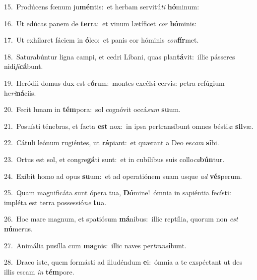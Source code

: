 {\numbfont\textcolor{\numbcolor}{15.}}~Prodúcens fœnum ju\-\textbf{mén}\-tis:~\star et herbam servitú\textit{ti} \textbf{hó}\-minum:\par
{\numbfont\textcolor{\numbcolor}{16.}}~Ut edúcas panem de \textbf{ter}\-ra:~\star et vinum lætíficet \textit{cor} \textbf{hó}\-minis:\par
{\numbfont\textcolor{\numbcolor}{17.}}~Ut exhílaret fáciem in \textbf{ó}\-leo:~\star et panis cor hóminis \textit{con}\-\textbf{fír}met.\par
{\numbfont\textcolor{\numbcolor}{18.}}~Saturabúntur ligna campi, et cedri Líbani, quas plan\-\textbf{tá}\-vit:~\star illic pásseres nidi\-\textit{fi}\-\textbf{cá}bunt.\par
{\numbfont\textcolor{\numbcolor}{19.}}~Heródii domus dux est e\-\textbf{ó}\-rum:~\star montes excélsi cervis: petra refúgium he\-\textit{ri}\-\textbf{ná}ciis.\par
{\numbfont\textcolor{\numbcolor}{20.}}~Fecit lunam in \textbf{tém}\-pora:~\star sol cognóvit occá\textit{sum} \textbf{su}\-um.\par
{\numbfont\textcolor{\numbcolor}{21.}}~Posuísti ténebras, et facta \textbf{est} nox:~\star in ipsa pertransíbunt omnes bésti\textit{æ} \textbf{sil}\-væ.\par
{\numbfont\textcolor{\numbcolor}{22.}}~Cátuli leónum rugiéntes, ut \textbf{rá}\-piant:~\star et quærant a Deo es\textit{cam} \textbf{si}\-bi.\par
{\numbfont\textcolor{\numbcolor}{23.}}~Ortus est sol, et congre\-\textbf{gá}\-ti sunt:~\star et in cubílibus suis collo\-\textit{ca}\-\textbf{bún}tur.\par
{\numbfont\textcolor{\numbcolor}{24.}}~Exíbit homo ad opus \textbf{su}\-um:~\star et ad operatiónem suam usque \textit{ad} \textbf{vés}\-perum.\par
{\numbfont\textcolor{\numbcolor}{25.}}~Quam magnificáta sunt ópera tua, \textbf{Dó}\-mine!~\star ómnia in sapiéntia fecísti: impléta est terra possessió\textit{ne} \textbf{tu}\-a.\par
{\numbfont\textcolor{\numbcolor}{26.}}~Hoc mare magnum, et spatiósum \textbf{má}\-nibus:~\star illic reptília, quorum non \textit{est} \textbf{nú}\-merus.\par
{\numbfont\textcolor{\numbcolor}{27.}}~Animália pusílla cum \textbf{ma}\-gnis:~\star illic naves per\-\textit{trans}\-\textbf{í}bunt.\par
{\numbfont\textcolor{\numbcolor}{28.}}~Draco iste, quem formásti ad illudéndum \textbf{e}\-i:~\star ómnia a te exspéctant ut des illis escam \textit{in} \textbf{tém}\-pore.\par
